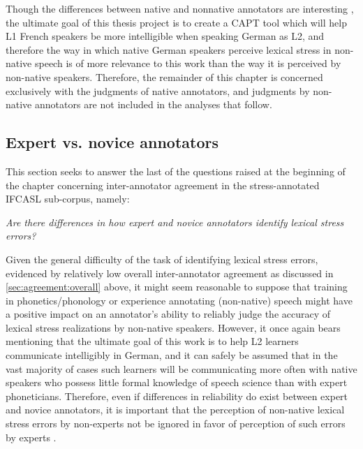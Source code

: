 		Though the differences between native and nonnative annotators are interesting , the ultimate goal of this thesis project is to create a CAPT tool which will help L1 French speakers be more intelligible when speaking German as L2, and therefore the way in which native German speakers perceive lexical stress in non-native speech is of more relevance to this work than the way it is perceived by non-native speakers. Therefore, the remainder of this chapter is concerned exclusively with the judgments of native annotators, and judgments by non-native annotators are not included in the analyses that follow.
			
		
		\subsection{Expert vs. novice annotators}
		\label{sec:agreement:expert}
		
		
		
	 This section seeks to answer the last of the questions raised at the beginning of the chapter concerning inter-annotator agreement in the stress-annotated IFCASL sub-corpus, namely:
	
	\textit{Are there differences in how expert and novice annotators identify lexical stress errors?}
	
	Given the general difficulty of the task of identifying lexical stress errors, evidenced by relatively low overall inter-annotator agreement as discussed in \cref{sec:agreement:overall} above, it might seem reasonable to suppose that training in phonetics/phonology or experience annotating (non-native) speech might have a positive impact on an annotator's ability to reliably judge the accuracy of lexical stress realizations by non-native speakers. However, it once again bears mentioning that the ultimate goal of this work is to help L2 learners communicate intelligibly in German, and it can safely be assumed that in the vast majority of cases such learners will be communicating more often with native speakers who possess little formal knowledge of speech science than with expert phoneticians. Therefore, even if differences in reliability do exist between expert and novice annotators, it is important that the perception of non-native lexical stress errors by non-experts not be ignored in favor of perception of such errors by experts . 
	

